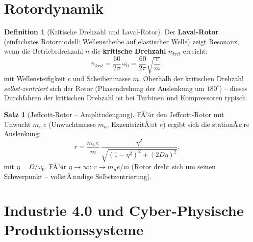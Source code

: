 ﻿\documentclass[a4paper,12pt]{report}
\theoremstyle{definition}
\newtheorem{definition}{Definition}
\newtheorem{satz}{Satz}
\begin{document}
\section{Rotordynamik}

\begin{definition}[Kritische Drehzahl und Laval-Rotor]
Der \textbf{Laval-Rotor} (einfachstes Rotormodell: Wellenscheibe auf
elastischer Welle) zeigt Resonanz, wenn die Betriebsdrehzahl $n$ die
\textbf{kritische Drehzahl} $n_{krit}$ erreicht:
\[
  n_{krit} = \frac{60}{2\pi}\,\omega_0 = \frac{60}{2\pi}\sqrt{\frac{c}{m}},
\]
mit Wellensteifigkeit $c$ und Scheibenmasse $m$.
Oberhalb der kritischen Drehzahl \emph{selbst-zentriert} sich der Rotor
(Phasendrehung der Auslenkung um $180^\circ$) -- dieses Durchfahren
der kritischen Drehzahl ist bei Turbinen und Kompressoren typisch.
\end{definition}

\begin{satz}[Jeffcott-Rotor -- Amplitudengang]
FÃ¼r den Jeffcott-Rotor mit Unwucht $m_u\,e$ (Unwuchtmasse $m_u$,
ExzentrizitÃ¤t $e$) ergibt sich die stationÃ¤re Auslenkung:
\[
  r = \frac{m_u e}{m}\,\frac{\eta^2}{\sqrt{(1-\eta^2)^2+(2D\eta)^2}},
\]
mit $\eta = \Omega/\omega_0$. FÃ¼r $\eta \to \infty$: $r \to m_u e / m$
(Rotor dreht sich um seinen Schwerpunkt -- vollstÃ¤ndige Selbstzentrierung).
\end{satz}



\section{Industrie 4.0 und Cyber-Physische Produktionssysteme}
\end{document}

